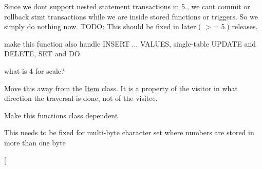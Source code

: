 \begin{DoxyRefList}
\item[\label{todo__todo000019}%
\Hypertarget{todo__todo000019}%
Member \mbox{\hyperlink{handler_8cc_a9a81ce45b63a150449fb897a34572bb1}{ha\+\_\+commit\+\_\+trans}} (T\+HD $\ast$thd, bool all, bool ignore\+\_\+global\+\_\+read\+\_\+lock)]Since we don\textquotesingle{}t support nested statement transactions in 5., we can\textquotesingle{}t commit or rollback stmt transactions while we are inside stored functions or triggers. So we simply do nothing now. T\+O\+DO\+: This should be fixed in later ( $>$= 5.) releases.  
\item[\label{todo__todo000118}%
\Hypertarget{todo__todo000118}%
Member \mbox{\hyperlink{group__Query__Optimizer_gae77d58d476f44178e469e2cbe16e9e01}{handle\+\_\+query}} (T\+HD $\ast$thd, L\+EX $\ast$lex, Query\+\_\+result $\ast$result, ulonglong added\+\_\+options, ulonglong removed\+\_\+options)]make this function also handle I\+N\+S\+E\+RT ... V\+A\+L\+U\+ES, single-\/table U\+P\+D\+A\+TE and D\+E\+L\+E\+TE, S\+ET and DO. 
\item[\label{todo__todo000025}%
\Hypertarget{todo__todo000025}%
Member \mbox{\hyperlink{structHybrid__type__traits__decimal_abacf79142edb4cc12105279b750ac73d}{Hybrid\+\_\+type\+\_\+traits\+\_\+decimal\+:\+:div}} (\mbox{\hyperlink{structHybrid__type}{Hybrid\+\_\+type}} $\ast$val, ulonglong u) const]what is \textquotesingle{}4\textquotesingle{} for scale?  
\item[\label{todo__todo000030}%
\Hypertarget{todo__todo000030}%
Member \mbox{\hyperlink{classItem_a4e68f315ba2a26543339e9f0efed3695}{Item\+:\+:enum\+\_\+walk}} ]
\begin{DoxyEnumerate}
\item Move this away from the \mbox{\hyperlink{classItem}{Item}} class. It is a property of the visitor in what direction the traversal is done, not of the visitee. 
\end{DoxyEnumerate}
\item[\label{todo__todo000026}%
\Hypertarget{todo__todo000026}%
Member \mbox{\hyperlink{classItem_a875594d2b9d99ccff3863bfd435828f0}{Item\+:\+:val\+\_\+bool}} ()]Make this functions class dependent  
\item[\label{todo__todo000035}%
\Hypertarget{todo__todo000035}%
Member \mbox{\hyperlink{classItem__func__format_a9f01cf724eacb711a5874955671fdc67}{Item\+\_\+func\+\_\+format\+:\+:val\+\_\+str\+\_\+ascii}} (String $\ast$)]This needs to be fixed for multi-\/byte character set where numbers are stored in more than one byte  
\item[\label{todo__todo000034}%

\end{DoxyRefList}

